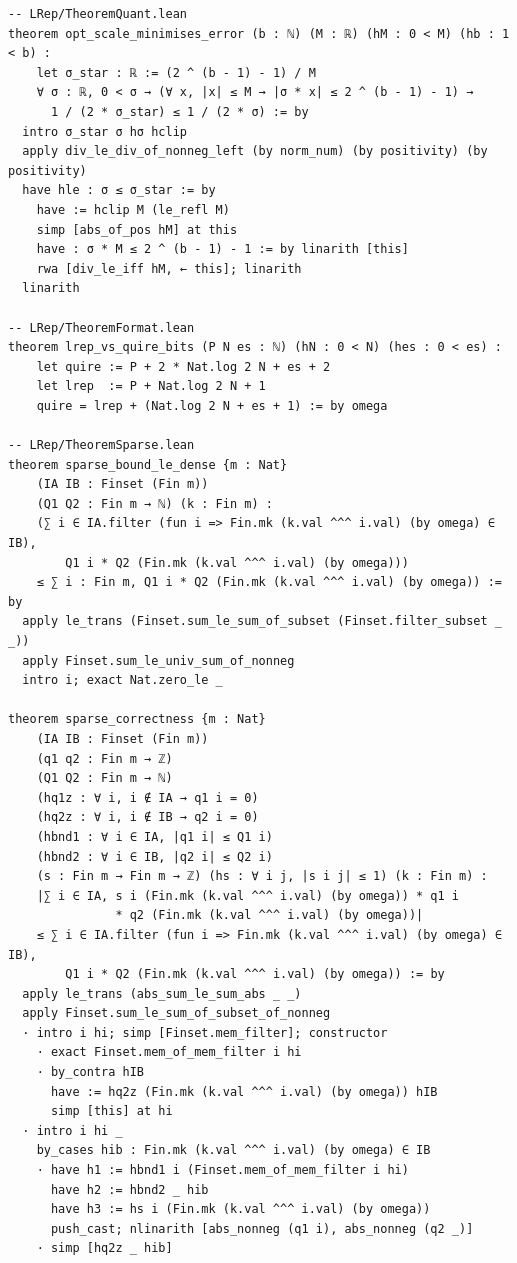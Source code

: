\documentclass[11pt,a4paper]{article}
\theoremstyle{definition}
\theoremstyle{plain}
\theoremstyle{remark}
\begin{document}
\begin{leanblock}
\begin{lstlisting}[language={}]
-- LRep/TheoremQuant.lean
theorem opt_scale_minimises_error (b : ℕ) (M : ℝ) (hM : 0 < M) (hb : 1 < b) :
    let σ_star : ℝ := (2 ^ (b - 1) - 1) / M
    ∀ σ : ℝ, 0 < σ → (∀ x, |x| ≤ M → |σ * x| ≤ 2 ^ (b - 1) - 1) →
      1 / (2 * σ_star) ≤ 1 / (2 * σ) := by
  intro σ_star σ hσ hclip
  apply div_le_div_of_nonneg_left (by norm_num) (by positivity) (by positivity)
  have hle : σ ≤ σ_star := by
    have := hclip M (le_refl M)
    simp [abs_of_pos hM] at this
    have : σ * M ≤ 2 ^ (b - 1) - 1 := by linarith [this]
    rwa [div_le_iff hM, ← this]; linarith
  linarith

-- LRep/TheoremFormat.lean
theorem lrep_vs_quire_bits (P N es : ℕ) (hN : 0 < N) (hes : 0 < es) :
    let quire := P + 2 * Nat.log 2 N + es + 2
    let lrep  := P + Nat.log 2 N + 1
    quire = lrep + (Nat.log 2 N + es + 1) := by omega

-- LRep/TheoremSparse.lean
theorem sparse_bound_le_dense {m : Nat}
    (IA IB : Finset (Fin m))
    (Q1 Q2 : Fin m → ℕ) (k : Fin m) :
    (∑ i ∈ IA.filter (fun i => Fin.mk (k.val ^^^ i.val) (by omega) ∈ IB),
        Q1 i * Q2 (Fin.mk (k.val ^^^ i.val) (by omega)))
    ≤ ∑ i : Fin m, Q1 i * Q2 (Fin.mk (k.val ^^^ i.val) (by omega)) := by
  apply le_trans (Finset.sum_le_sum_of_subset (Finset.filter_subset _ _))
  apply Finset.sum_le_univ_sum_of_nonneg
  intro i; exact Nat.zero_le _

theorem sparse_correctness {m : Nat}
    (IA IB : Finset (Fin m))
    (q1 q2 : Fin m → ℤ)
    (Q1 Q2 : Fin m → ℕ)
    (hq1z : ∀ i, i ∉ IA → q1 i = 0)
    (hq2z : ∀ i, i ∉ IB → q2 i = 0)
    (hbnd1 : ∀ i ∈ IA, |q1 i| ≤ Q1 i)
    (hbnd2 : ∀ i ∈ IB, |q2 i| ≤ Q2 i)
    (s : Fin m → Fin m → ℤ) (hs : ∀ i j, |s i j| ≤ 1) (k : Fin m) :
    |∑ i ∈ IA, s i (Fin.mk (k.val ^^^ i.val) (by omega)) * q1 i
               * q2 (Fin.mk (k.val ^^^ i.val) (by omega))|
    ≤ ∑ i ∈ IA.filter (fun i => Fin.mk (k.val ^^^ i.val) (by omega) ∈ IB),
        Q1 i * Q2 (Fin.mk (k.val ^^^ i.val) (by omega)) := by
  apply le_trans (abs_sum_le_sum_abs _ _)
  apply Finset.sum_le_sum_of_subset_of_nonneg
  · intro i hi; simp [Finset.mem_filter]; constructor
    · exact Finset.mem_of_mem_filter i hi
    · by_contra hIB
      have := hq2z (Fin.mk (k.val ^^^ i.val) (by omega)) hIB
      simp [this] at hi
  · intro i hi _
    by_cases hib : Fin.mk (k.val ^^^ i.val) (by omega) ∈ IB
    · have h1 := hbnd1 i (Finset.mem_of_mem_filter i hi)
      have h2 := hbnd2 _ hib
      have h3 := hs i (Fin.mk (k.val ^^^ i.val) (by omega))
      push_cast; nlinarith [abs_nonneg (q1 i), abs_nonneg (q2 _)]
    · simp [hq2z _ hib]
\end{lstlisting}
\end{leanblock}
\end{document}
